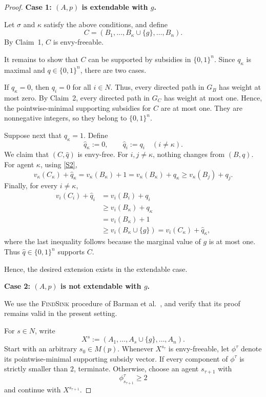 \documentclass[sigconf,anonymous,nonacm]{aamas}
\begin{document}
\begin{proof}
\medskip
\noindent
\textbf{Case 1: $(A,p)$ is extendable with $g$.}

Let $\sigma$ and $\kappa$ satisfy the above conditions, and define
\[
C=(B_1,\ldots,B_\kappa\cup\{g\},\ldots,B_n).
\]
By Claim~1, $C$ is envy-freeable.

It remains to show that $C$ can be supported by subsidies in $\{0,1\}^n$. Since $q_\kappa$ is maximal and
$q\in\{0,1\}^n$, there are two cases.

If $q_\kappa=0$, then $q_i=0$ for all $i\in N$. Thus, every directed path in $G_B$ has weight at most zero. By Claim~2, every directed path in $G_C$ has weight at most one. Hence, the pointwise-minimal supporting subsidies for $C$ are at most one. They are nonnegative integers, so they belong to $\{0,1\}^n$.

Suppose next that $q_\kappa=1$. Define
\[
\widehat q_\kappa:=0,
\qquad
\widehat q_i:=q_i
\quad (i\neq\kappa).
\]
We claim that $(C,\widehat q)$ is envy-free. For $i,j\neq\kappa$, nothing changes from $(B,q)$. For agent
$\kappa$, using \eqref{S2},
\[
v_\kappa(C_\kappa)+\widehat q_\kappa
=
v_\kappa(B_\kappa)+1
=
v_\kappa(B_\kappa)+q_\kappa
\geq
v_\kappa(B_j)+q_j.
\]
Finally, for every $i\neq\kappa$,
\[
\begin{aligned}
v_i(C_i)+\widehat q_i
&=v_i(B_i)+q_i\\
&\geq v_i(B_\kappa)+q_\kappa\\
&=v_i(B_\kappa)+1\\
&\geq v_i(B_\kappa\cup\{g\})
 =v_i(C_\kappa)+\widehat q_\kappa,
\end{aligned}
\]
where the last inequality follows because the marginal value of $g$ is at most one. Thus $\widehat q\in\{0,1\}^n$ supports $C$.

Hence, the desired extension exists in the extendable case.

\medskip
\noindent
\textbf{Case 2: $(A,p)$ is not extendable with $g$.}

We use the \textsc{FindSink} procedure of Barman et al.~\cite{BKNS22}, and verify that its proof remains valid in the
present setting.

For $s\in N$, write
\[
X^s:=(A_1,\ldots,A_s\cup\{g\},\ldots,A_n).
\]
Start with an arbitrary $s_0\in M(p)$. Whenever $X^{s_\tau}$ is envy-freeable, let $\phi^\tau$ denote its pointwise-minimal supporting subsidy vector. If every component of $\phi^\tau$ is strictly smaller than $2$, terminate. Otherwise, choose an agent
$s_{\tau+1}$ with
\[
\phi^\tau_{s_{\tau+1}}\geq2
\]
and continue with $X^{s_{\tau+1}}$.


\end{proof}
\end{document}
